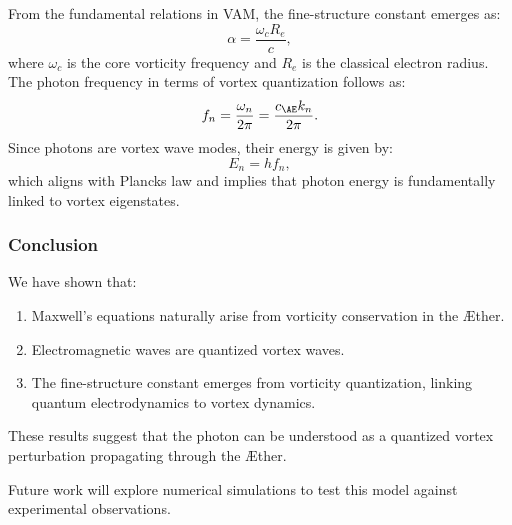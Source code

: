 From the fundamental relations in VAM, the fine-structure constant emerges as:
\begin{equation*}
    \alpha = \frac{\omega_c R_e}{c},
\end{equation*}
where $\omega_c$ is the core vorticity frequency and $R_e$ is the classical electron radius. The photon frequency in terms of vortex quantization follows as:
\begin{equation*}
    f_n = \frac{\omega_n}{2\pi} = \frac{c_{\AE} k_n}{2\pi}.
\end{equation*}
Since photons are vortex wave modes, their energy is given by:
\begin{equation*}
    E_n = h f_n,
\end{equation*}
which aligns with Planck\rqs s law and implies that photon energy is fundamentally linked to vortex eigenstates.

\subsubsection*{Conclusion}

We have shown that:
\begin{enumerate}
    \item Maxwell's equations naturally arise from vorticity conservation in the Æther.
    \item Electromagnetic waves are quantized vortex waves.
    \item The fine-structure constant emerges from vorticity quantization, linking quantum electrodynamics to vortex dynamics.
\end{enumerate}
These results suggest that the photon can be understood as a quantized vortex perturbation propagating through the Æther.

Future work will explore numerical simulations to test this model against experimental observations.